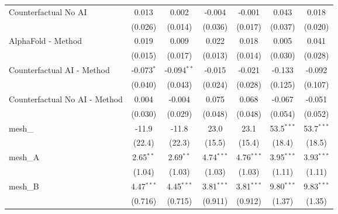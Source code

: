 \begin{tabular}{lcccccc}
   Counterfactual No AI                                        & 0.013         & 0.002         & -0.004        & -0.001         & 0.043         & 0.018\\   
                                                               & (0.026)       & (0.014)       & (0.036)       & (0.017)        & (0.037)       & (0.020)\\   
   AlphaFold - Method                                          & 0.019         & 0.009         & 0.022         & 0.018          & 0.005         & 0.041\\   
                                                               & (0.015)       & (0.017)       & (0.013)       & (0.014)        & (0.030)       & (0.028)\\   
   Counterfactual AI - Method                                  & -0.073$^{*}$  & -0.094$^{**}$ & -0.015        & -0.021         & -0.133        & -0.092\\   
                                                               & (0.040)       & (0.043)       & (0.024)       & (0.028)        & (0.125)       & (0.107)\\   
   Counterfactual No AI - Method                               & 0.004         & -0.004        & 0.075         & 0.068          & -0.067        & -0.051\\   
                                                               & (0.030)       & (0.029)       & (0.048)       & (0.048)        & (0.054)       & (0.052)\\   
   mesh\_                                                      & -11.9         & -11.8         & 23.0          & 23.1           & 53.5$^{***}$  & 53.7$^{***}$\\   
                                                               & (22.4)        & (22.3)        & (15.5)        & (15.4)         & (18.4)        & (18.5)\\   
   mesh\_A                                                     & 2.65$^{**}$   & 2.69$^{**}$   & 4.74$^{***}$  & 4.76$^{***}$   & 3.95$^{***}$  & 3.93$^{***}$\\   
                                                               & (1.04)        & (1.03)        & (1.03)        & (1.03)         & (1.11)        & (1.11)\\   
   mesh\_B                                                     & 4.47$^{***}$  & 4.45$^{***}$  & 3.81$^{***}$  & 3.81$^{***}$   & 9.80$^{***}$  & 9.83$^{***}$\\   
                                                               & (0.716)       & (0.715)       & (0.911)       & (0.912)        & (1.37)        & (1.35)\\   

\end{tabular}

